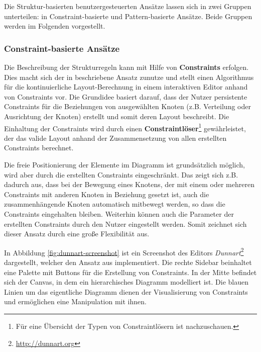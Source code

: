 Die Struktur-basierten benutzergesteuerten Ansätze lassen sich in zwei Gruppen unterteilen: in Constraint-basierte und Pattern-basierte Ansätze. Beide Gruppen werden im Folgenden vorgestellt.

\subsubsection{Constraint-basierte Ansätze}
\label{subsubsec:constraint-based-approaches}

Die Beschreibung der Strukturregeln kann mit Hilfe von \textbf{Constraints} erfolgen. Dies macht sich der in \cite{Wybrow08Using} beschriebene Ansatz zunutze und stellt einen Algorithmus für die kontinuierliche Layout-Berechnung in einem interaktiven Editor anhand von Constraints vor. Die Grundidee basiert darauf, dass der Nutzer persistente Constraints für die Beziehungen von ausgewählten Knoten (z.B. Verteilung oder Ausrichtung der Knoten) erstellt und somit deren Layout beschreibt. Die Einhaltung der Constraints wird durch einen \textbf{Constraintlöser}\footnote{Für eine Übersicht der Typen von Constraintlösern ist \cite[S.18ff]{Maier12A-Pattern-based} nachzuschauen.} gewährleistet, der das valide Layout anhand der Zusammensetzung von allen erstellten Constraints berechnet.

Die freie Positionierung der Elemente im Diagramm ist grundsätzlich 
möglich, wird aber durch die erstellten Constraints eingeschränkt. Das zeigt sich z.B. dadurch aus, dass bei der Bewegung eines Knotens, der mit einem oder mehreren Constraints mit anderen Knoten in Beziehung gesetzt ist, auch die zusammenhängende Knoten automatisch mitbewegt werden, so dass die Constraints eingehalten bleiben. Weiterhin können auch die Parameter der erstellten Constraints durch den Nutzer eingestellt werden. Somit zeichnet sich dieser Ansatz durch eine große Flexibilität aus.

In Abbildung \ref{fig:dunnart-screenshot} ist ein Screenshot des Editors \textit{Dunnart}\footnote{\url{http://dunnart.org}} dargestellt, welcher den Ansatz aus \cite{Wybrow08Using} implementiert. Die rechte Sidebar beinhaltet eine Palette mit Buttons für die Erstellung von Constraints. In der Mitte befindet sich der Canvas, in dem ein hierarchisches Diagramm modelliert ist. Die blauen Linien um das eigentliche Diagramm dienen der Visualisierung von Constraints und ermöglichen eine Manipulation mit ihnen.


